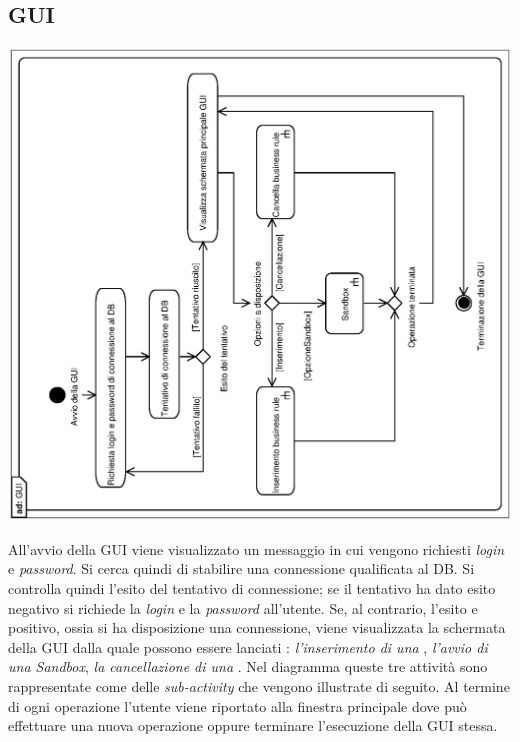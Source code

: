 \documentclass[11pt,titlepage,a4paper]{report}
\begin{document}
\subsection{GUI}
\begin{center}
 \includegraphics[width=1\textwidth, angle=-90]{GUI.eps}
\end{center}
All'avvio della GUI viene visualizzato un messaggio in cui vengono richiesti \textit{login} e \textit{password}. Si cerca quindi di stabilire una connessione qualificata al DB. 
Si controlla quindi l'esito del tentativo di connessione; se il tentativo ha dato esito negativo si richiede la \textit{login} e la
 \textit{password} all'utente. Se, al contrario, l'esito e positivo, ossia si ha disposizione una connessione, viene visualizzata la schermata della GUI dalla quale  possono essere lanciati :\textit{ l'inserimento di una \br}, \textit{l'avvio di una Sandbox}, \textit{la cancellazione di una \br}.
Nel diagramma queste tre attivit\`a sono rappresentate come delle \textit{sub-activity} che vengono illustrate di seguito. Al termine di ogni operazione l'utente viene riportato alla finestra principale dove pu\`o effettuare una nuova operazione oppure terminare l'esecuzione della GUI stessa.
\end{document}
